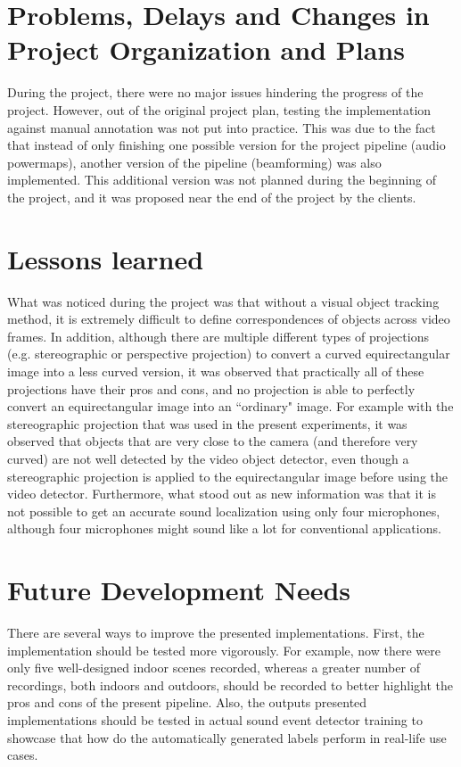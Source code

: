 \section{Problems, Delays and Changes in Project Organization and Plans}

During the project, there were no major issues hindering the progress of the project. However, out of the original project plan, testing the implementation against manual annotation was not put into practice. This was due to the fact that instead of only finishing one possible version for the project pipeline (audio powermaps), another version of the pipeline (beamforming) was also implemented. This additional version was not planned during the beginning of the project, and it was proposed near the end of the project by the clients.

\section{Lessons learned}

What was noticed during the project was that without a visual object tracking method, it is extremely difficult to define correspondences of objects across video frames. In addition, although there are multiple different types of projections (e.g. stereographic or perspective projection) to convert a curved equirectangular image into a less curved version, it was observed that practically all of these projections have their pros and cons, and no projection is able to perfectly convert an equirectangular image into an ``ordinary" image. For example with the stereographic projection that was used in the present experiments, it was observed that objects that are very close to the camera (and therefore very curved) are not well detected by the video object detector, even though a stereographic projection is applied to the equirectangular image before using the video detector. Furthermore, what stood out as new information was that it is not possible to get an accurate sound localization using only four microphones, although four microphones might sound like a lot for conventional applications.


\section{Future Development Needs} \label{sec_future_development_needs}

There are several ways to improve the presented implementations. First, the implementation should be tested more vigorously. For example, now there were only five well-designed indoor scenes recorded, whereas a greater number of recordings, both indoors and outdoors, should be recorded to better highlight the pros and cons of the present pipeline. Also, the outputs presented implementations should be tested in actual sound event detector training to showcase that how do the automatically generated labels perform in real-life use cases.

